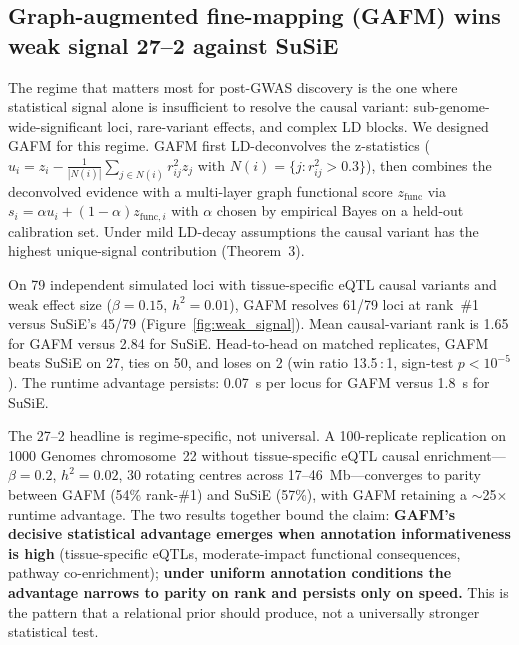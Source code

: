 \subsection*{Graph-augmented fine-mapping (GAFM) wins weak signal 27--2 against SuSiE}

The regime that matters most for post-GWAS discovery is the one
where statistical signal alone is insufficient to resolve the causal
variant: sub-genome-wide-significant loci, rare-variant effects, and
complex LD blocks. We designed GAFM for this
regime. GAFM first LD-deconvolves the z-statistics
($u_i = z_i - \frac{1}{|N(i)|} \sum_{j \in N(i)} r^2_{ij} z_j$ with
$N(i) = \{j : r^2_{ij} > 0.3\}$), then combines the deconvolved
evidence with a multi-layer graph functional score $z_{\text{func}}$
via $s_i = \alpha u_i + (1-\alpha) z_{\text{func},i}$ with
$\alpha$ chosen by empirical Bayes on a held-out calibration set.
Under mild LD-decay assumptions the causal variant has the highest
unique-signal contribution (Theorem~3).

On 79 independent simulated loci with tissue-specific eQTL causal
variants and weak effect size ($\beta = 0.15$, $h^2 = 0.01$), GAFM
resolves 61/79 loci at rank~\#1 versus SuSiE's 45/79
(Figure~\ref{fig:weak_signal}). Mean causal-variant rank is 1.65
for GAFM versus 2.84 for SuSiE. Head-to-head on matched replicates, GAFM
beats SuSiE on 27, ties on 50, and loses on 2 (win ratio 13.5\,:\,1,
sign-test $p < 10^{-5}$). The runtime advantage persists: 0.07~s per
locus for GAFM versus 1.8~s for SuSiE.

The 27--2 headline is regime-specific, not universal. A 100-replicate
replication on 1000 Genomes chromosome~22 without tissue-specific
eQTL causal enrichment---$\beta = 0.2$, $h^2 = 0.02$, 30 rotating
centres across 17--46~Mb---converges to parity between GAFM (54\%
rank-\#1) and SuSiE (57\%), with GAFM retaining a $\sim$25$\times$
runtime advantage. The two results together bound the claim:
\textbf{GAFM's decisive statistical advantage emerges when annotation
informativeness is high} (tissue-specific eQTLs, moderate-impact
functional consequences, pathway co-enrichment); \textbf{under
uniform annotation conditions the advantage narrows to parity on
rank and persists only on speed.} This is the pattern that a
relational prior should produce, not a universally stronger
statistical test.

